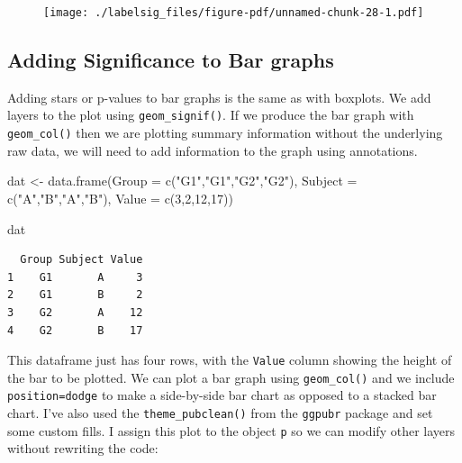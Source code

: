 \documentclass[
  letterpaper,
  DIV=11,
  numbers=noendperiod]{scrreprt}
\newenvironment{Shaded}{\begin{snugshade}}{\end{snugshade}}
\newcommand{\AttributeTok}[1]{\textcolor[rgb]{0.40,0.45,0.13}{#1}}
\newcommand{\DecValTok}[1]{\textcolor[rgb]{0.68,0.00,0.00}{#1}}
\newcommand{\FunctionTok}[1]{\textcolor[rgb]{0.28,0.35,0.67}{#1}}
\newcommand{\NormalTok}[1]{\textcolor[rgb]{0.00,0.23,0.31}{#1}}
\newcommand{\OtherTok}[1]{\textcolor[rgb]{0.00,0.23,0.31}{#1}}
\newcommand{\StringTok}[1]{\textcolor[rgb]{0.13,0.47,0.30}{#1}}
\begin{document}
\begin{figure}[H]

{\centering \texttt{[image: ./labelsig\_files/figure-pdf/unnamed-chunk-28-1.pdf]}

}

\end{figure}

\hypertarget{adding-significance-to-bar-graphs}{%
\subsection{Adding Significance to Bar
graphs}\label{adding-significance-to-bar-graphs}}

Adding stars or p-values to bar graphs is the same as with boxplots. We
add layers to the plot using \texttt{geom\_signif()}. If we produce the
bar graph with \texttt{geom\_col()} then we are plotting summary
information without the underlying raw data, we will need to add
information to the graph using annotations.

\begin{Shaded}
\begin{Highlighting}[]
\NormalTok{dat }\OtherTok{\textless{}{-}} \FunctionTok{data.frame}\NormalTok{(}\AttributeTok{Group =} \FunctionTok{c}\NormalTok{(}\StringTok{"G1"}\NormalTok{,}\StringTok{"G1"}\NormalTok{,}\StringTok{"G2"}\NormalTok{,}\StringTok{"G2"}\NormalTok{),}
                   \AttributeTok{Subject =} \FunctionTok{c}\NormalTok{(}\StringTok{"A"}\NormalTok{,}\StringTok{"B"}\NormalTok{,}\StringTok{"A"}\NormalTok{,}\StringTok{"B"}\NormalTok{),}
                   \AttributeTok{Value =} \FunctionTok{c}\NormalTok{(}\DecValTok{3}\NormalTok{,}\DecValTok{2}\NormalTok{,}\DecValTok{12}\NormalTok{,}\DecValTok{17}\NormalTok{))}

\NormalTok{dat}
\end{Highlighting}
\end{Shaded}

\begin{verbatim}
  Group Subject Value
1    G1       A     3
2    G1       B     2
3    G2       A    12
4    G2       B    17
\end{verbatim}

This dataframe just has four rows, with the \texttt{Value} column
showing the height of the bar to be plotted. We can plot a bar graph
using \texttt{geom\_col()} and we include
\texttt{position=\textquotesingle{}dodge\textquotesingle{}} to make a
side-by-side bar chart as opposed to a stacked bar chart. I've also used
the \texttt{theme\_pubclean()} from the \texttt{ggpubr} package and set
some custom fills. I assign this plot to the object \texttt{p} so we can
modify other layers without rewriting the code:
\end{document}
